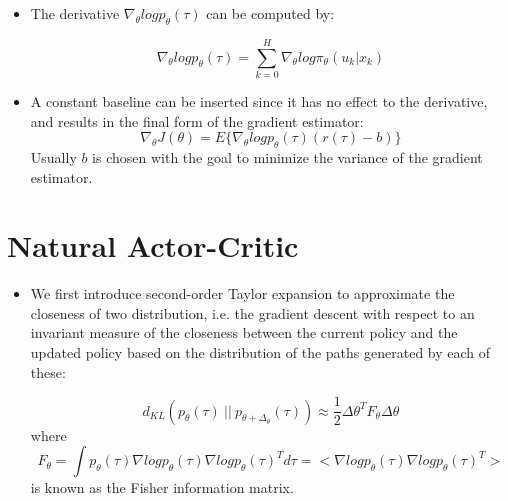 {\begin{pcolumn}
{\begin{itemize}
\begin{eqnarray}
	& \nabla_\theta J(\theta) = \int \nabla_\theta p_\theta(\tau) r(\tau) d\tau \nonumber \\
	& = \int p_\theta(\tau) \nabla_\theta log p_\theta (\tau) r(\tau) d(\tau) \nonumber \\
	& = E \{ \nabla_\theta log p_\theta (\tau) r (\tau)\}
\end{eqnarray}

	\item The derivative $\nabla_\theta log p_\theta (\tau)$ can be computed by:

\begin{equation}
	\nabla_\theta log p_\theta (\tau) = \sum_{k=0}^H \nabla_\theta log \pi_\theta (u_k | x_k)
\end{equation}
	\item A constant baseline can be inserted since it has no effect to the derivative, and results in the final form of the gradient estimator:
\begin{equation}
	\nabla_\theta J(\theta) = E\{\nabla_\theta log p_\theta(\tau) (r(\tau) - b)\}
\end{equation}
Usually $b$ is chosen with the goal to minimize the variance of the gradient estimator.

\end{itemize}
\vspace*{2mm}
}
\section{Natural Actor-Critic}
\vspace*{-20mm}
%
{\large
\begin{itemize}
	\item We first introduce second-order Taylor expansion to approximate the closeness of two distribution, i.e. the gradient descent with respect to an invariant measure of the closeness between the current policy and the updated policy based on the distribution of the paths generated by each of these: \vspace{-2mm}

\begin{equation}
	d_{KL} (p_\theta(\tau) \ || \ p_{\theta+\Delta_\theta}(\tau)) \approx \frac{1}{2} \Delta \theta^T F_\theta \Delta \theta
\end{equation}
where
\begin{equation}
	F_\theta = \int p_\theta(\tau) \nabla log p_\theta(\tau) \nabla log p_\theta (\tau)^T d\tau = \big<\nabla log p_\theta(\tau) \nabla log p_\theta(\tau)^T\big>
\end{equation}
is known as the Fisher information matrix.


\end{itemize}}
\end{pcolumn}}
